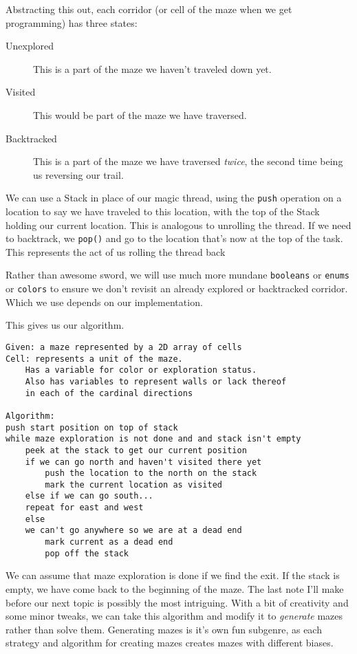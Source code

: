 Abstracting this out, each corridor (or cell of the maze when we get programming) has three states:

\begin{description}
	\item[Unexplored] This is a part of the maze we haven't traveled down yet.
	\item[Visited] This would be part of the maze we have traversed.
	\item[Backtracked] This is a part of the maze we have traversed \textit{twice}, the second time being us reversing our trail.
\end{description}

We can use a Stack in place of our magic thread, using the \texttt{push} operation on a location to say we have traveled to this location, with the top of the Stack holding our current location.  This is analogous to unrolling the thread. If we need to backtrack, we \texttt{pop()} and go to the location that's now at the top of the task.  This represents the act of us rolling the thread back

Rather than awesome sword, we will use much more mundane \texttt{booleans} or \texttt{enums} or \texttt{colors} to ensure we don't revisit an already explored or backtracked corridor.  Which we use depends on our implementation.


This gives us our algorithm.

\begin{verbatim}
Given: a maze represented by a 2D array of cells
Cell: represents a unit of the maze. 
    Has a variable for color or exploration status.
    Also has variables to represent walls or lack thereof
    in each of the cardinal directions

Algorithm:
push start position on top of stack
while maze exploration is not done and and stack isn't empty
    peek at the stack to get our current position
    if we can go north and haven't visited there yet
        push the location to the north on the stack
        mark the current location as visited
    else if we can go south...
    repeat for east and west
    else
    we can't go anywhere so we are at a dead end
        mark current as a dead end
        pop off the stack
\end{verbatim}


We can assume that maze exploration is done if we find the exit.  If the stack is empty, we have come back to the beginning of the maze.  
The last note I'll make before our next topic is possibly the most intriguing.  With a bit of creativity and some minor tweaks, we can take this algorithm and modify it to \textit{generate} mazes rather than solve them. Generating mazes is it's own fun subgenre, as each strategy and algorithm for creating mazes creates mazes with different biases. 


